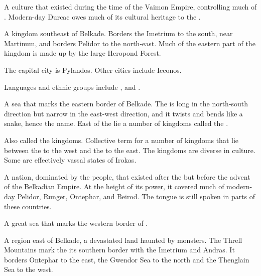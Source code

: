 \gitem{\Shurco{} \Bacconate}
A \scathaese{} culture that existed during the time of the Vaimon Empire, controlling much of \DurcacContinent. Modern-day Durcac owes much of its cultural heritage to the \Shurco.



\gitem{\Scyrum{}}
A kingdom southeast of Belkade. 
Borders the Imetrium to the south, near Martinum, and borders Pelidor to the north-east. 
Much of the eastern part of the kingdom is made up by the large Heropond Forest. 

The capital city is Pylandos. Other cities include Icconos. 

Languages and ethnic groups include \Tepharin, \Samurin{} and \Ortic. 



\gitem{\Serpsea}
A sea that marks the eastern border of Belkade. The \Serp{} is long in the north-south direction but narrow in the east-west direction, and it twists and bends like a snake, hence the name. East of the \Serp{} lie a number of kingdoms called the \Serplands{}. 
\also{\Serplands}




\gitemthe{\Serplands}
Also called the \Serpadj{} kingdoms. Collective term for a number of kingdoms that lie between the \Serpsea{} to the west and the \Dragonridge{} to the east. The \Serpadj{} kingdoms are diverse in culture. Some are effectively vassal states of Irokas. 



\gitem{\Tepharin{} \Bacconate}
A nation, dominated by the \Tepharite{} people, that existed after the \darkfall{} but before the advent of the Belkadian Empire. At the height of its power, it covered much of modern-day Pelidor, Runger, Ontephar, \Scyrum{} and Beirod. The \Tepharin{} tongue is still spoken in parts of these countries. 
\also{\Tepharite}



A great sea that marks the western border of \Azmith. 



A region east of Belkade, a devastated land haunted by monsters. The Threll Mountains mark the its southern border with the Imetrium and Andras. It borders Ontephar to the east, the Gwendor Sea to the north and the Thenglain Sea to the west. 



